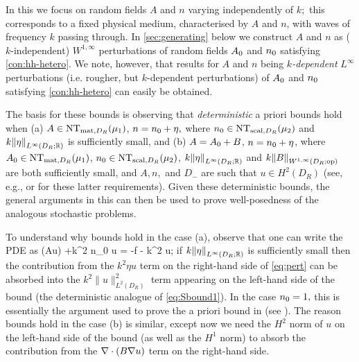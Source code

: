 \label{rem:kdep}
In this  we focus on random fields $A$ and $n$ varying independently of $k;$ this corresponds to a fixed physical
medium, characterised by $A$ and $n$, with waves of frequency $k$ passing through.
In \cref{sec:generating} below we construct $A$ and $n$ as ($k$-independent) $W^{1,\infty}$ perturbations of random fields $A_{0}$ and $n_{0}$ satisfying \cref{con:hh-hetero}.
We note, however, that results for $A$ and $n$ being
\emph{$k$-dependent} $L^\infty$ perturbations (i.e. rougher, but $k$-dependent perturbations) of $A_{0}$
and $n_{0}$ satisfying \cref{con:hh-hetero} can easily be obtained.

The basis for these bounds is observing that \emph{deterministic} a priori bounds hold when
(a) $A\in \NTA{\mu_1}$, $n = n_{0} + \eta,$ where $\nz \in \NTn{\mu_2}$
and $k\NLiDRRR{\eta}$ is sufficiently small, and
(b) $A=A_{0}+B$, $n=n_{0}+\eta$, where $\Az\in \NTA{\mu_1}$, $\nz \in
\NTn{\mu_2}$, $k\NLiDRRR{\eta}$ and $k \NWoiDRRRdtd{B}$ are
both sufficiently small, and $A, n,$ and $D_-$ are such that $u\in
H^2(D_R)$ (see, e.g., \cite[Theorem 4.18(i)]{Mc:00} or \cite[Theorems
2.3.3.2 and 2.4.2.5]{Gr:85} for these latter requirements). Given these deterministic bounds, the general arguments in this 
can then be used to prove well-posedness of the analogous stochastic
problems.

To understand why bounds hold in the case (a), observe that one can
write the PDE as
\beq\label{eq:pert}
\nabla \cdot(A\grad u) +k^2 n_0 u = -f - k^2 \eta u;
\eeq
if $k\NLiDRRR{\eta}$ is sufficiently small then the contribution from
the $k^2 \eta u$ term on the right-hand side of \eqref{eq:pert} can be
absorbed into the $k^2\|u\|^2_{L^2(D_R)}$ term appearing on the left-hand
side of the bound (the deterministic analogue of \eqref{eq:Sbound1}).
In the case $n_{0}=1,$ this is essentially the argument used to prove the
a priori bound in \cite[Theorem 2.4]{FeLiLo:15} (see \cite[Remark
2.15]{GrPeSp:19}).
The reason bounds hold in the case (b) is similar, except now we need
the $H^2$ norm of $u$ on the left-hand side of the bound (as well as
the $H^1$ norm) to absorb the contribution from the $\nabla \cdot
(B\nabla u)$ term on the right-hand side.
\ere
